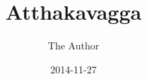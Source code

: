 \documentclass[
  final,
  pagePreset=tallpage,
  babelLanguage=slovene,
]{anecdote}
\title{Atthakavagga}
\subtitle{}
\author{The Author}
\date{2014-11-27}
\begin{document}
\frontmatter

\cleartorecto
\tableofcontents*

%



\mainmatter






%
%
%
%
%
\end{document}
